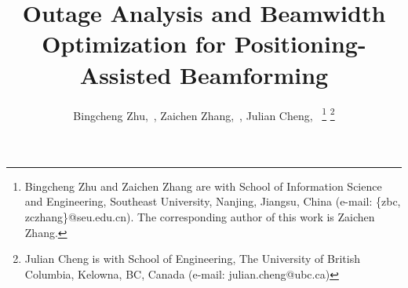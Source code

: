 \documentclass{IEEEtran}
\begin{document}
%
\title{Outage Analysis and Beamwidth Optimization for Positioning-Assisted Beamforming}

\author{Bingcheng Zhu,~,
        Zaichen Zhang,~,
        Julian Cheng,~
\thanks{Bingcheng Zhu and Zaichen Zhang are with School of Information Science and Engineering, Southeast University, Nanjing, Jiangsu, China (e-mail: \{zbc, zczhang\}@seu.edu.cn). The corresponding author of this work is Zaichen Zhang.}%
\thanks{Julian Cheng is with School of Engineering,  The University of British Columbia, Kelowna, BC, Canada (e-mail: {julian.cheng@ubc.ca})}
}



%
\end{document}
